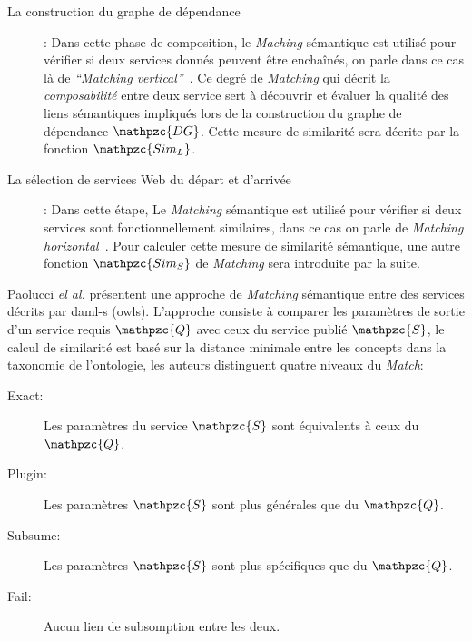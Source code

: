 \begin{description}
\item [La construction du graphe de dépendance]: Dans cette phase de
  composition, le \emph{Maching} sémantique est utilisé pour vérifier
  si deux services donnés peuvent être enchaînés, on parle dans ce cas
  là de \emph{``Matching vertical''}~\cite{temglit2012graph}. Ce degré
  de \emph{Matching} qui décrit la \emph{composabilité} entre deux
  service sert à découvrir et évaluer la qualité des liens sémantiques
  impliqués lors de la construction du graphe de dépendance
  $\mathpzc{DG}$. Cette mesure de similarité sera décrite par la
  fonction {\large $\mathpzc{Sim_L}$}.\

\item [La sélection de services Web du départ et d'arrivée]: Dans
  cette étape, Le \emph{Matching} sémantique est utilisé pour vérifier
  si deux services sont fonctionnellement similaires, dans ce cas on
  parle de \emph{Matching horizontal}~\cite{temglit2012graph}. Pour
  calculer cette mesure de similarité sémantique, une autre fonction
  {\large $\mathpzc{Sim_S}$} de \emph{Matching} sera introduite par la
  suite.\medskip
\end{description}

Paolucci \emph{el al.} \cite{paolucci2002semantic} présentent une
approche de \emph{Matching} sémantique entre des services décrits par
\acrshort{daml-s} (\acrshort{owls}). L'approche consiste à comparer
les paramètres de sortie d'un service requis {\large $\mathpzc{Q}$}
avec ceux du service publié {\large $\mathpzc{S}$}, le calcul de
similarité est basé sur la distance minimale entre les concepts dans
la taxonomie de l'ontologie, les auteurs distinguent quatre niveaux du
\emph{Match}:

\begin{description}
\item [Exact:] Les paramètres du service {\large $\mathpzc{S}$} sont
  équivalents à ceux du {\large $\mathpzc{Q}$}.

\item [Plugin:] Les paramètres {\large $\mathpzc{S}$} sont plus
  générales que du {\large $\mathpzc{Q}$}.

\item [Subsume:] Les paramètres {\large $\mathpzc{S}$} sont plus
  spécifiques que du {\large $\mathpzc{Q}$}.

\item [Fail:] Aucun lien de subsomption entre les deux.
\end{description}

